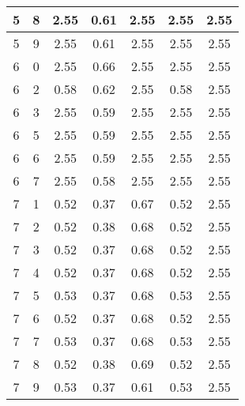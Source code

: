 \begin{longtable}{|c|c||c||c|c||c|c|}
	5 & 8 & 2.55 & 0.61 & 2.55 & 2.55 & 2.55 \\ \hline
	5 & 9 & 2.55 & 0.61 & 2.55 & 2.55 & 2.55 \\ \hline
	6 & 0 & 2.55 & 0.66 & 2.55 & 2.55 & 2.55 \\ \hline
	6 & 2 & 0.58 & 0.62 & 2.55 & 0.58 & 2.55 \\ \hline
	6 & 3 & 2.55 & 0.59 & 2.55 & 2.55 & 2.55 \\ \hline
	6 & 5 & 2.55 & 0.59 & 2.55 & 2.55 & 2.55 \\ \hline
	6 & 6 & 2.55 & 0.59 & 2.55 & 2.55 & 2.55 \\ \hline
	6 & 7 & 2.55 & 0.58 & 2.55 & 2.55 & 2.55 \\ \hline
	7 & 1 & 0.52 & 0.37 & 0.67 & 0.52 & 2.55 \\ \hline
	7 & 2 & 0.52 & 0.38 & 0.68 & 0.52 & 2.55 \\ \hline
	7 & 3 & 0.52 & 0.37 & 0.68 & 0.52 & 2.55 \\ \hline
	7 & 4 & 0.52 & 0.37 & 0.68 & 0.52 & 2.55 \\ \hline
	7 & 5 & 0.53 & 0.37 & 0.68 & 0.53 & 2.55 \\ \hline
	7 & 6 & 0.52 & 0.37 & 0.68 & 0.52 & 2.55 \\ \hline
	7 & 7 & 0.53 & 0.37 & 0.68 & 0.53 & 2.55 \\ \hline
	7 & 8 & 0.52 & 0.38 & 0.69 & 0.52 & 2.55 \\ \hline
	7 & 9 & 0.53 & 0.37 & 0.61 & 0.53 & 2.55 \\ \hline
\end{longtable}
\clearpage{}
